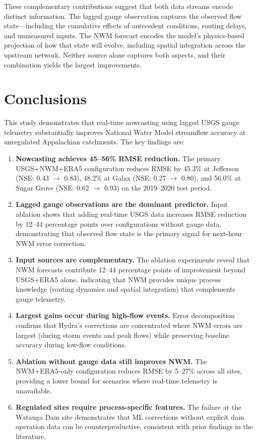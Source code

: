 \documentclass[draft]{agujournal2019}
\begin{document}
These complementary contributions suggest that both data streams encode distinct information. The lagged gauge observation captures the observed flow state---including the cumulative effects of antecedent conditions, routing delays, and unmeasured inputs. The NWM forecast encodes the model's physics-based projection of how that state will evolve, including spatial integration across the upstream network. Neither source alone captures both aspects, and their combination yields the largest improvements.


\section{Conclusions}

This study demonstrates that real-time nowcasting using lagged USGS gauge telemetry substantially improves National Water Model streamflow accuracy at unregulated Appalachian catchments. The key findings are:

\begin{enumerate}
    \item \textbf{Nowcasting achieves 45--56\% RMSE reduction.} The primary USGS+NWM+ERA5 configuration reduces RMSE by 45.3\% at Jefferson (NSE: 0.43 $\to$ 0.83), 48.2\% at Galax (NSE: 0.27 $\to$ 0.80), and 56.0\% at Sugar Grove (NSE: 0.62 $\to$ 0.93) on the 2019--2020 test period.

    \item \textbf{Lagged gauge observations are the dominant predictor.} Input ablation shows that adding real-time USGS data increases RMSE reduction by 12--44 percentage points over configurations without gauge data, demonstrating that observed flow state is the primary signal for next-hour NWM error correction.

    \item \textbf{Input sources are complementary.} The ablation experiments reveal that NWM forecasts contribute 12--44 percentage points of improvement beyond USGS+ERA5 alone, indicating that NWM provides unique process knowledge (routing dynamics and spatial integration) that complements gauge telemetry.

    \item \textbf{Largest gains occur during high-flow events.} Error decomposition confirms that Hydra's corrections are concentrated where NWM errors are largest (during storm events and peak flows) while preserving baseline accuracy during low-flow conditions.

    \item \textbf{Ablation without gauge data still improves NWM.} The NWM+ERA5-only configuration reduces RMSE by 5--27\% across all sites, providing a lower bound for scenarios where real-time telemetry is unavailable.

    \item \textbf{Regulated sites require process-specific features.} The failure at the Watauga Dam site demonstrates that ML corrections without explicit dam operation data can be counterproductive, consistent with prior findings in the literature.
\end{enumerate}
\end{document}
